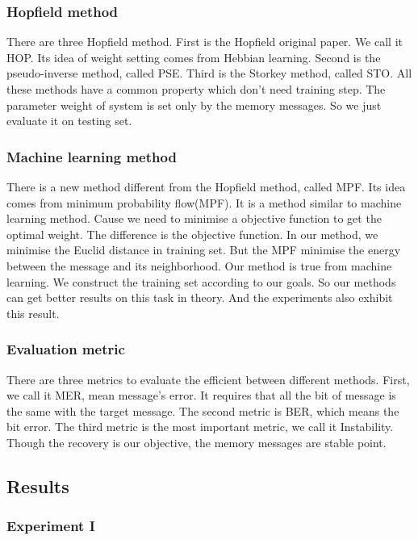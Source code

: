\subsubsection{Hopfield method}

There are three Hopfield method. First is the Hopfield original paper. We call it HOP. Its idea of weight setting comes from Hebbian learning. Second is the pseudo-inverse method, called PSE. Third is the Storkey method, called STO. All these methods have a common property which don't need training step. The parameter weight of system is set only by the memory messages. So we just evaluate it on testing set.

\subsubsection{Machine learning method}

There is a new method different from the Hopfield method, called MPF. Its idea comes from minimum probability flow(MPF). It is a method similar to machine learning method. Cause we need to minimise a objective function to get the optimal weight. The difference is the objective function. In our method, we minimise the Euclid distance in training set. But the MPF minimise the energy between the message and its neighborhood. Our method is true from machine learning. We construct the training set according to our goals. So our methods can get better results on this task in theory. And the experiments also exhibit this result.

\subsubsection{Evaluation metric}

There are three metrics to evaluate the efficient between different methods. First, we call it MER, mean message's error. It requires that all the bit of message is the same with the target message. The second metric is BER, which means the bit error. The third metric is the most important metric, we call it Instability. Though the recovery is our objective, the memory messages are stable point.

\subsection{Results}

\subsubsection{Experiment I}

